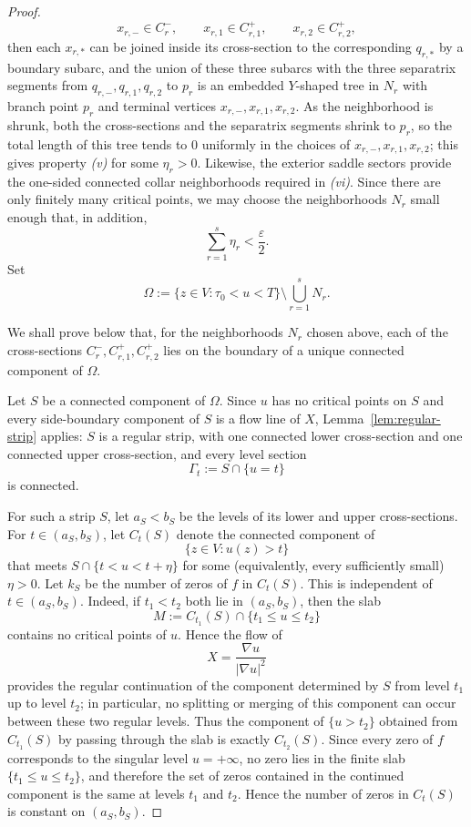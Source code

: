 \documentclass[12pt]{amsart}
\theoremstyle{definition}
\theoremstyle{remark}
\begin{document}
\begin{proof}
\[
x_{r,-}\in C_r^-,
\qquad
x_{r,1}\in C_{r,1}^+,
\qquad
x_{r,2}\in C_{r,2}^+,
\]
then each $x_{r,*}$ can be joined inside its cross-section to the corresponding $q_{r,*}$ by a boundary subarc, and the union of these three subarcs with the three separatrix segments from $q_{r,-},q_{r,1},q_{r,2}$ to $p_r$ is an embedded $Y$-shaped tree in $N_r$ with branch point $p_r$ and terminal vertices $x_{r,-},x_{r,1},x_{r,2}$. As the neighborhood is shrunk, both the cross-sections and the separatrix segments shrink to $p_r$, so the total length of this tree tends to $0$ uniformly in the choices of $x_{r,-},x_{r,1},x_{r,2}$; this gives property \emph{(v)} for some $\eta_r>0$. Likewise, the exterior saddle sectors provide the one-sided connected collar neighborhoods required in \emph{(vi)}. Since there are only finitely many critical points, we may choose the neighborhoods $N_r$ small enough that, in addition,
\[
\sum_{r=1}^s \eta_r<\frac{\varepsilon}{2}.
\]
Set
\[
\Omega:=\{z\in V:\tau_0<u<T\}\setminus \bigcup_{r=1}^s N_r.
\]

We shall prove below that, for the neighborhoods $N_r$ chosen above, each of the cross-sections $C_r^{-}, C_{r,1}^{+}, C_{r,2}^{+}$
lies on the boundary of a unique connected component of $\Omega$.

Let $S$ be a connected component of $\Omega$. Since $u$ has no critical points on $S$ and every side-boundary
component of $S$ is a flow line of $X$, Lemma~\ref{lem:regular-strip} applies: $S$ is a regular strip, with one connected lower
cross-section and one connected upper cross-section, and every level section
\[
\Gamma_t:=S\cap\{u=t\}
\]
is connected.

\indent For such a strip $S$, let $a_S<b_S$ be the levels of its lower and upper cross-sections.
For $t\in(a_S,b_S)$, let $C_t(S)$ denote the connected component of
\[
\{z\in V:u(z)>t\}
\]
that meets $S\cap\{t<u<t+\eta\}$ for some (equivalently, every sufficiently small)
$\eta>0$. Let $k_S$ be the number of zeros of $f$ in $C_t(S)$. This is independent of
$t\in(a_S,b_S)$. Indeed, if $t_1<t_2$ both lie in $(a_S,b_S)$, then the slab
\[
M:=C_{t_1}(S)\cap\{t_1\le u\le t_2\}
\]
contains no critical points of $u$. Hence the flow of
\[
X=\frac{\nabla u}{|\nabla u|^2}
\]
provides the regular continuation of the component determined by $S$ from level $t_1$ up to level $t_2$; in particular, no splitting or merging of this component can occur between these two regular levels. Thus the component of $\{u>t_2\}$ obtained from $C_{t_1}(S)$ by passing through the slab is exactly $C_{t_2}(S)$. Since every zero of $f$ corresponds to the singular level $u=+\infty$, no zero lies in the finite slab $\{t_1\le u\le t_2\}$, and therefore the set of zeros contained in the continued component is the same at levels $t_1$ and $t_2$. Hence the number of zeros in $C_t(S)$ is constant on $(a_S,b_S)$.


\end{proof}
\end{document}
